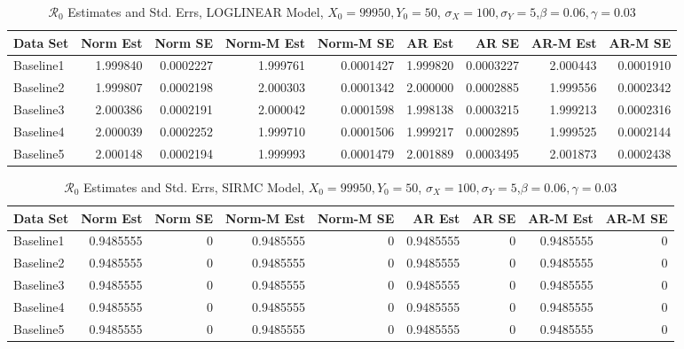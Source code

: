 \documentclass[12pt]{article}
\newcommand{\rr}{\ensuremath{\mathcal{R}_0}}
\begin{document}
\begin{table}[H]
	
	\caption{\label{tab:}$\rr$ Estimates and Std. Errs, LOGLINEAR Model,
		$X_0 = 99950, Y_0 = 50$, $\sigma_X = 100, \sigma_Y = 5$,$\beta = 0.06, \gamma = 0.03$}
	\centering
	\begin{footnotesize}
	\begin{tabular}[t]{l|r|r|r|r|r|r|r|r}
		\hline
		Data Set & Norm Est & Norm SE & Norm-M Est & Norm-M SE & AR Est & AR SE & AR-M Est & AR-M SE\\
		\hline
		Baseline1 & 1.999840 & 0.0002227 & 1.999761 & 0.0001427 & 1.999820 & 0.0003227 & 2.000443 & 0.0001910\\
		\hline
		Baseline2 & 1.999807 & 0.0002198 & 2.000303 & 0.0001342 & 2.000000 & 0.0002885 & 1.999556 & 0.0002342\\
		\hline
		Baseline3 & 2.000386 & 0.0002191 & 2.000042 & 0.0001598 & 1.998138 & 0.0003215 & 1.999213 & 0.0002316\\
		\hline
		Baseline4 & 2.000039 & 0.0002252 & 1.999710 & 0.0001506 & 1.999217 & 0.0002895 & 1.999525 & 0.0002144\\
		\hline
		Baseline5 & 2.000148 & 0.0002194 & 1.999993 & 0.0001479 & 2.001889 & 0.0003495 & 2.001873 & 0.0002438\\
		\hline
	\end{tabular}
\end{footnotesize}
\end{table}
\begin{table}[H]
	
	\caption{\label{tab:}$\rr$ Estimates and Std. Errs, SIRMC Model,
		$X_0 = 99950, Y_0 = 50$, $\sigma_X = 100, \sigma_Y = 5$,$\beta = 0.06, \gamma = 0.03$}
	\centering
	\begin{footnotesize}
	\begin{tabular}[t]{l|r|r|r|r|r|r|r|r}
		\hline
		Data Set & Norm Est & Norm SE & Norm-M Est & Norm-M SE & AR Est & AR SE & AR-M Est & AR-M SE\\
		\hline
		Baseline1 & 0.9485555 & 0 & 0.9485555 & 0 & 0.9485555 & 0 & 0.9485555 & 0\\
		\hline
		Baseline2 & 0.9485555 & 0 & 0.9485555 & 0 & 0.9485555 & 0 & 0.9485555 & 0\\
		\hline
		Baseline3 & 0.9485555 & 0 & 0.9485555 & 0 & 0.9485555 & 0 & 0.9485555 & 0\\
		\hline
		Baseline4 & 0.9485555 & 0 & 0.9485555 & 0 & 0.9485555 & 0 & 0.9485555 & 0\\
		\hline
		Baseline5 & 0.9485555 & 0 & 0.9485555 & 0 & 0.9485555 & 0 & 0.9485555 & 0\\
		\hline
	\end{tabular}
\end{footnotesize}
\end{table}
\end{document}
